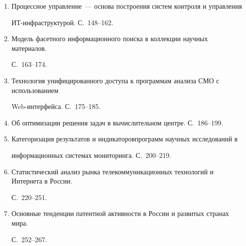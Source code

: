 \begin{enumerate}[1.]
Современные технологии тестирования Web-приложений. С.~138--147.





\item {}


Процессное управление~--- основа построения систем контроля и управления 


ИТ-инфра\-струк\-ту\-рой. С.~148--162.





\item {}


Модель фасетного информационного поиска в коллекции научных материалов. 


С.~163--174.


\item {}


Технология унифицированного доступа к программам анализа СМО с использованием 


Web-ин\-тер\-фей\-са. С.~175--185.





\item {}


Об оптимизации решения задач в вычислительном центре. С.~186--199.





\item {}


Категоризация результатов и индикаторов\linebreak программ научных исследований в 


информационных системах мониторинга. С.~200--219.





\item




Статистический анализ рынка телекоммуникационных технологий и Интернета в России. 


С.~220--251.





\item {}


Основные тенденции патентной активности в России и развитых странах мира.\linebreak 


С.~252--267.


\end{enumerate}





